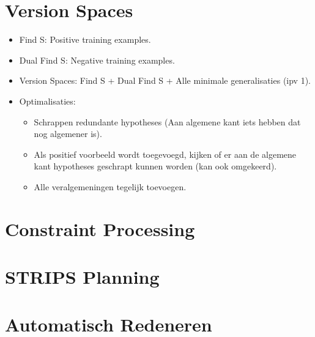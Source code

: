 \documentclass{report}
\begin{document}
  \section{Version Spaces}
    \begin{itemize}
      \item Find S: Positive training examples.
      \item Dual Find S: Negative training examples.
      \item Version Spaces: Find S + Dual Find S + Alle minimale generalisaties (ipv 1).
      \item Optimalisaties:
      \begin{itemize}
        \item Schrappen redundante hypotheses (Aan algemene kant iets hebben dat nog algemener is).
        \item Als positief voorbeeld wordt toegevoegd, kijken of er aan de algemene kant hypotheses geschrapt kunnen worden (kan ook omgekeerd).
        \item Alle veralgemeningen tegelijk toevoegen.
      \end{itemize}
    \end{itemize}

  \section{Constraint Processing}

  \section{STRIPS Planning}

  \section{Automatisch Redeneren}
\end{document}
